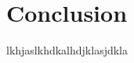 \renewcommand{\baselinestretch}{1.5}\normalsize
\chapter{Conclusion}


\label{Chapter Conclusion}

lkhjaslkhdkalhdjklasjdkla

